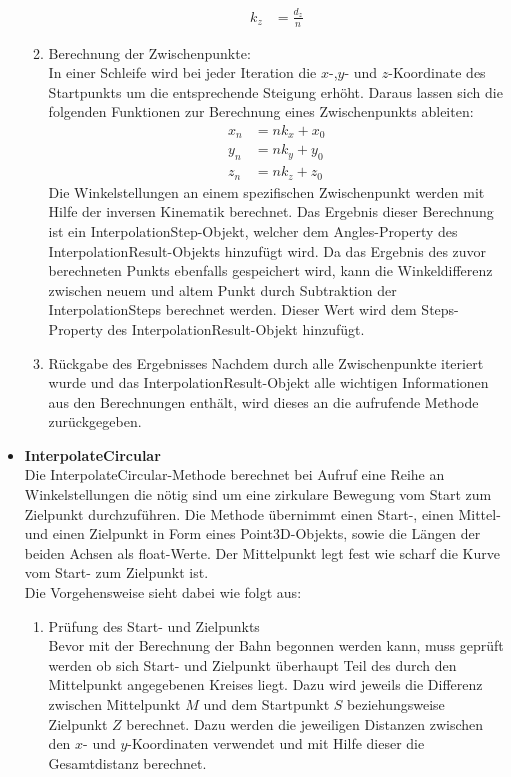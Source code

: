 \begin{itemize}
\begin{enumerate}
\begin{align*}
k_z & = \frac{d_z}{n}
\end{align*}
\item Berechnung der Zwischenpunkte:\\
In einer Schleife wird bei jeder Iteration die $x$-,$y$- und $z$-Koordinate des Startpunkts um die entsprechende Steigung erhöht. Daraus lassen sich die folgenden Funktionen zur Berechnung eines Zwischenpunkts ableiten:
\begin{align*}
x_n & = n k_x + x_0\\
y_n & =  n k_y + y_0\\
z_n & = n k_z + z_0 
\end{align*}
Die Winkelstellungen an einem spezifischen Zwischenpunkt werden mit Hilfe der inversen Kinematik berechnet. Das Ergebnis dieser Berechnung ist ein InterpolationStep-Objekt, welcher dem Angles-Property des InterpolationResult-Objekts hinzufügt wird. Da das Ergebnis des zuvor berechneten Punkts ebenfalls gespeichert wird, kann die Winkeldifferenz zwischen neuem und altem Punkt durch Subtraktion der InterpolationSteps berechnet werden. Dieser Wert wird dem Steps-Property des InterpolationResult-Objekt hinzufügt.
\item Rückgabe des Ergebnisses
Nachdem durch alle Zwischenpunkte iteriert wurde und das InterpolationResult-Objekt alle wichtigen Informationen aus den Berechnungen enthält, wird dieses an die aufrufende Methode zurückgegeben.
\end{enumerate}
\item \textbf{InterpolateCircular}\\
Die InterpolateCircular-Methode berechnet bei Aufruf eine Reihe an Winkelstellungen die nötig sind um eine zirkulare Bewegung vom Start zum Zielpunkt durchzuführen. Die Methode übernimmt einen Start-, einen Mittel- und einen Zielpunkt in Form eines Point3D-Objekts, sowie die Längen der beiden Achsen als float-Werte. Der Mittelpunkt legt fest wie scharf die Kurve vom Start- zum Zielpunkt ist.\\
Die Vorgehensweise sieht dabei wie folgt aus:
\begin{enumerate}
\item Prüfung des Start- und Zielpunkts\\
Bevor mit der Berechnung der Bahn begonnen werden kann, muss geprüft werden ob sich Start- und Zielpunkt überhaupt Teil des durch den Mittelpunkt angegebenen Kreises liegt. Dazu wird jeweils die Differenz zwischen Mittelpunkt $M$ und dem Startpunkt $S$ beziehungsweise Zielpunkt $Z$ berechnet. Dazu werden die jeweiligen Distanzen zwischen den $x$- und $y$-Koordinaten verwendet und mit Hilfe dieser die Gesamtdistanz berechnet.

\end{enumerate}
\end{itemize}
